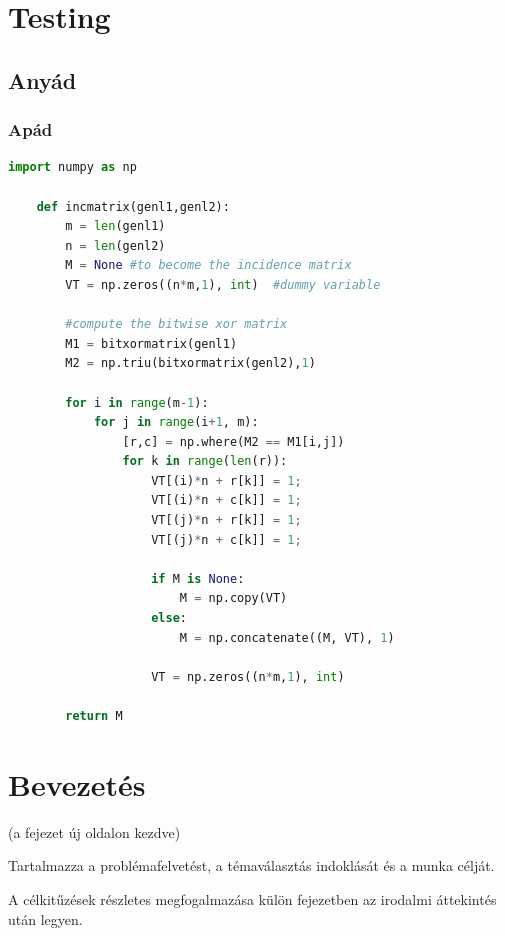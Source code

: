\documentclass[a4paper,12pt]{report}
\theoremstyle{definition}
\theoremstyle{remark}
\begin{document}
\chapter{Testing}
\section{Anyád}
\subsection{Apád}


\begin{lstlisting}[language=Python, caption=Python example]
    import numpy as np
        
    def incmatrix(genl1,genl2):
        m = len(genl1)
        n = len(genl2)
        M = None #to become the incidence matrix
        VT = np.zeros((n*m,1), int)  #dummy variable
        
        #compute the bitwise xor matrix
        M1 = bitxormatrix(genl1)
        M2 = np.triu(bitxormatrix(genl2),1) 
    
        for i in range(m-1):
            for j in range(i+1, m):
                [r,c] = np.where(M2 == M1[i,j])
                for k in range(len(r)):
                    VT[(i)*n + r[k]] = 1;
                    VT[(i)*n + c[k]] = 1;
                    VT[(j)*n + r[k]] = 1;
                    VT[(j)*n + c[k]] = 1;
                    
                    if M is None:
                        M = np.copy(VT)
                    else:
                        M = np.concatenate((M, VT), 1)
                    
                    VT = np.zeros((n*m,1), int)
        
        return M
    \end{lstlisting}

\chapter{Bevezetés}

(a fejezet új oldalon kezdve)

Tartalmazza a problémafelvetést, a témaválasztás indoklását és a munka célját.

A célkitűzések részletes megfogalmazása külön fejezetben az irodalmi áttekintés után legyen.
\end{document}
